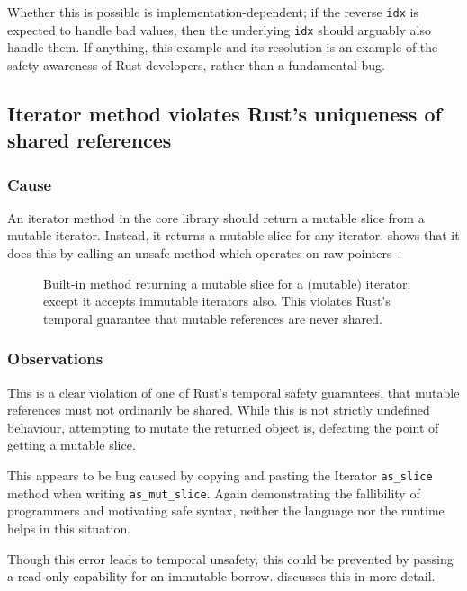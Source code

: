 \documentclass[dissertation.tex]{subfiles}
\begin{document}
Whether this is possible is implementation-dependent; if the
reverse \texttt{idx} is expected to handle bad values, then the
underlying \texttt{idx} should arguably also handle them.
If anything, this example  and its resolution is an example of the
safety awareness of Rust developers, rather than a fundamental bug.


\subsection{Iterator method violates Rust's uniqueness of shared references}
\label{sec:eval-bug-vec-mut}

\subsubsection{Cause}
An iterator method in the core library should return a mutable slice
from a mutable iterator.
Instead, it returns a mutable slice for any iterator.
 shows that it does this by calling an unsafe
method which operates on raw pointers~\cite{rust-issue-vec-mut}.

\begin{figure}[ht]
    
    \caption{
        Built-in method returning a mutable slice for a (mutable)
        iterator: except it accepts immutable iterators also.
        This violates Rust's temporal guarantee that mutable references
        are never shared.
    }
    \label{lst:bug-mutslice}
\end{figure}

\subsubsection{Observations}
This is a clear violation of one of Rust's temporal safety guarantees,
that mutable references must not ordinarily be shared.
While this is not strictly undefined behaviour, attempting to mutate the
returned object is, defeating the point of getting a mutable slice.

This appears to be bug caused by copying and pasting the Iterator
\texttt{as\_slice} method when writing \texttt{as\_mut\_slice}.
Again demonstrating the fallibility of programmers and motivating safe
syntax, neither the language nor the runtime helps in this situation.

Though this error leads to temporal unsafety, this could be prevented by
passing a read-only capability for an immutable borrow.
 discusses this in more detail.
\end{document}
